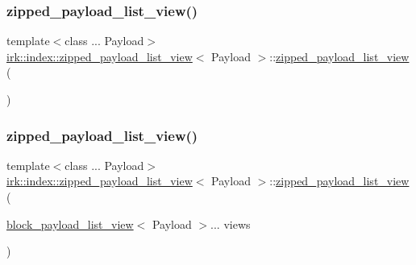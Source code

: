 \subsubsection{\texorpdfstring{zipped\+\_\+payload\+\_\+list\+\_\+view()}{zipped\_payload\_list\_view()}\hspace{0.1cm}{\footnotesize\ttfamily [1/2]}}
{\footnotesize\ttfamily template$<$class ... Payload$>$ \\
\mbox{\hyperlink{classirk_1_1index_1_1zipped__payload__list__view}{irk\+::index\+::zipped\+\_\+payload\+\_\+list\+\_\+view}}$<$ Payload $>$\+::\mbox{\hyperlink{classirk_1_1index_1_1zipped__payload__list__view}{zipped\+\_\+payload\+\_\+list\+\_\+view}} (\begin{DoxyParamCaption}{ }\end{DoxyParamCaption})\hspace{0.3cm}{\ttfamily [default]}}

\mbox{\label{classirk_1_1index_1_1zipped__payload__list__view_a47c5a4bf0f8fd1baf10f50bba6325092}} 
\subsubsection{\texorpdfstring{zipped\+\_\+payload\+\_\+list\+\_\+view()}{zipped\_payload\_list\_view()}\hspace{0.1cm}{\footnotesize\ttfamily [2/2]}}
{\footnotesize\ttfamily template$<$class ... Payload$>$ \\
\mbox{\hyperlink{classirk_1_1index_1_1zipped__payload__list__view}{irk\+::index\+::zipped\+\_\+payload\+\_\+list\+\_\+view}}$<$ Payload $>$\+::\mbox{\hyperlink{classirk_1_1index_1_1zipped__payload__list__view}{zipped\+\_\+payload\+\_\+list\+\_\+view}} (\begin{DoxyParamCaption}\item[{\mbox{\hyperlink{classirk_1_1index_1_1block__payload__list__view}{block\+\_\+payload\+\_\+list\+\_\+view}}$<$ Payload $>$...}]{views }\end{DoxyParamCaption})\hspace{0.3cm}{\ttfamily [inline]}}



